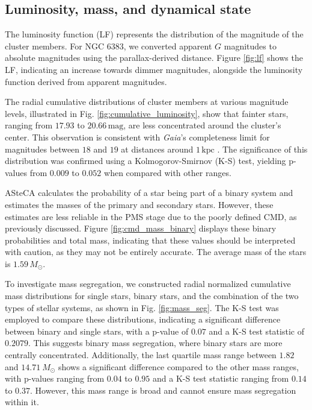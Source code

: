 \documentclass{aa}
\begin{document}
\subsection{Luminosity, mass, and dynamical state}\label{subsec:lum_mass_dyn}

The luminosity function (LF) represents the distribution of the magnitude of the cluster members. For NGC 6383, we converted apparent $G$ magnitudes to absolute magnitudes using the parallax-derived distance. Figure \ref{fig:lf} shows the LF, indicating an increase towards dimmer magnitudes, alongside the luminosity function derived from apparent magnitudes.

The radial cumulative distributions of cluster members at various magnitude levels, illustrated in Fig. \ref{fig:cumulative_luminosity}, show that fainter stars, ranging from $17.93$ to $20.66\,\mathrm{mag}$, are less concentrated around the cluster's center. This observation is consistent with \textit{Gaia}'s completeness limit for magnitudes between $18$ and $19$ at distances around $1\,\mathrm{kpc}$ \citep{2020MNRAS.497.4246B,2023AA...677A..37C}. The significance of this distribution was confirmed using a Kolmogorov-Smirnov (K-S) test, yielding p-values from $0.009$ to $0.052$ when compared with other ranges.

ASteCA calculates the probability of a star being part of a binary system and estimates the masses of the primary and secondary stars. However, these estimates are less reliable in the PMS stage due to the poorly defined CMD, as previously discussed. Figure \ref{fig:cmd_mass_binary} displays these binary probabilities and total mass, indicating that these values should be interpreted with caution, as they may not be entirely accurate. The average mass of the stars is $1.59\,M_\odot$. 

To investigate mass segregation, we constructed radial normalized cumulative mass distributions for single stars, binary stars, and the combination of the two types of stellar systems, as shown in Fig. \ref{fig:mass_seg}. The K-S test was employed to compare these distributions, indicating a significant difference between binary and single stars, with a p-value of $0.07$ and a K-S test statistic of $0.2079$. This suggests binary mass segregation, where binary stars are more centrally concentrated. Additionally, the last quartile mass range between $1.82$ and $14.71~M_\odot$ shows a significant difference compared to the other mass ranges, with p-values ranging from $0.04$ to $0.95$ and a K-S test statistic ranging from $0.14$ to $0.37$. However, this mass range is broad and cannot ensure mass segregation within it.
\end{document}
